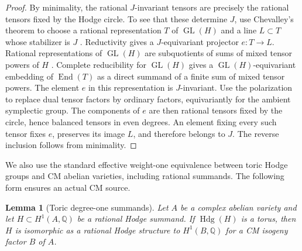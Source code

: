 \documentclass[11pt]{article}
\newcommand{\Q}{\mathbb Q}
\newtheorem{lemma}[theorem]{Lemma}
\numberwithin{equation}{section}
\begin{document}
\begin{proof}
By minimality, the rational $J$-invariant tensors are precisely the
rational tensors fixed by the Hodge circle.  To see that these determine
$J$, use Chevalley's theorem to choose a rational representation $T$
of $\operatorname{GL}(H)$ and a line $L\subset T$ whose stabilizer
is $J$ \cite[Theorem~4.27]{MilneAG2022}.  Reductivity gives a
$J$-equivariant projector $e:T\to L$.  Rational representations
of $\operatorname{GL}(H)$ are subquotients of sums of mixed tensor
powers of $H$ \cite[Theorem~4.14]{MilneAG2022}.  Complete reducibility
for $\operatorname{GL}(H)$ \cite[Theorem~22.42]{MilneAG2022}
gives a $\operatorname{GL}(H)$-equivariant embedding of
$\operatorname{End}(T)$ as a direct summand of a finite sum of
mixed tensor powers.  The element $e$ in this representation
is $J$-invariant.
Use the polarization to replace dual tensor factors by ordinary
factors, equivariantly for the ambient symplectic group.  The components
of $e$ are then rational tensors fixed by the circle, hence balanced
tensors in even degrees.  An element fixing every such tensor fixes
$e$, preserves its image $L$, and therefore belongs to $J$.
The reverse inclusion follows from minimality.
\end{proof}

We also use the standard effective weight-one equivalence between toric Hodge
groups and CM abelian varieties, including rational summands.  The following
form ensures an actual CM source.

\begin{lemma}[Toric degree-one summands]
\label{p3:toric-cm-factor}
Let $A$ be a complex abelian variety and let $H\subset H^1(A,\Q)$ be a
rational Hodge summand.  If $\operatorname{Hdg}(H)$ is a torus, then
$H$ is isomorphic as a rational Hodge structure to $H^1(B,\Q)$ for a
CM isogeny factor $B$ of $A$.
\end{lemma}
\end{document}
